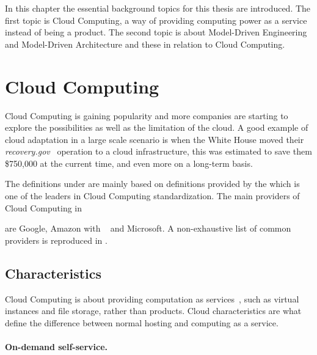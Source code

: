 
In this chapter the essential background topics for this thesis are introduced.
The first topic is Cloud Computing, a way of providing computing power as a service
instead of being a product.
The second topic is about Model-Driven Engineering and Model-Driven Architecture
and these in relation to Cloud Computing.

\section{Cloud Computing}


Cloud Computing is gaining popularity and more companies are starting 
to explore the possibilities as well as the limitation of the cloud.
A good example of cloud adaptation in a large scale scenario is when
the White House moved their \emph{recovery.gov}~\cite{recovery} operation to
a cloud infrastructure, this was estimated to save them \$750,000
at the current time, and even more on a long-term basis.

The definitions under are mainly based on definitions provided by 
the  which is one of the leaders in Cloud Computing standardization.
The main providers of Cloud Computing in \date{April 2012}
are Google, Amazon with ~\cite{aws} and Microsoft.
A non-exhaustive list of common providers is reproduced in .

\subsection{Characteristics}

Cloud Computing is about providing computation as services~\cite{nist:mell11}, 
such as virtual instances and file storage, rather than products. 
Cloud characteristics are what define
the difference between normal hosting and computing as a service.

\paragraph{On-demand self-service.} 

